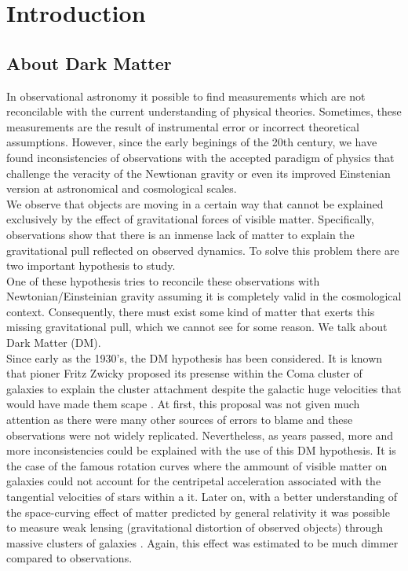 \chapter{Introduction}

\section{About Dark Matter}

In observational astronomy it possible to find measurements which are not reconcilable with the current understanding of physical theories. Sometimes, these measurements are the result of instrumental error or incorrect theoretical assumptions. However, since the early beginings of the 20th century, we have found inconsistencies of observations with the accepted paradigm of physics that challenge the veracity of the Newtionan gravity or even its improved Einstenian version at astronomical and cosmological scales.\\

We observe that objects are moving in a certain way that cannot be explained exclusively by the effect of gravitational forces of visible matter. Specifically, observations show that there is an inmense lack of matter to explain the gravitational pull reflected on observed dynamics. To solve this problem there are two important hypothesis to study.\\

One of these hypothesis tries to reconcile these observations with Newtonian/Einsteinian gravity assuming it is completely valid in the cosmological context. Consequently, there must exist some kind of matter that exerts this missing gravitational pull, which we cannot see for some reason. We talk about Dark Matter (DM).\\

Since early as the 1930's, the DM hypothesis has been considered. It is known that pioner Fritz Zwicky proposed its presense within the Coma cluster of galaxies to explain the cluster attachment despite the galactic huge velocities that would have made them scape \cite{Zwicky_1937}. At first, this proposal was not given much attention as there were many other sources of errors to blame and these observations were not widely replicated. Nevertheless, as years passed, more and more inconsistencies could be explained with the use of this DM hypothesis. It is the case of the famous rotation curves \cite{Faber_and_Gallagher_1979,Rubin_et_al._1980,Persic_et_al._1996} where the ammount of visible matter on galaxies could not account for the centripetal acceleration associated with the tangential velocities of stars within a it. Later on, with a better understanding of the space-curving effect of matter predicted by general relativity it was possible to measure weak lensing (gravitational distortion of observed objects) through massive clusters of galaxies \cite{Kaiser_and_Squires,Wittman_et_al._2000,Clowe_et_al._2006}. Again, this effect was estimated to be much dimmer compared to observations.\\

